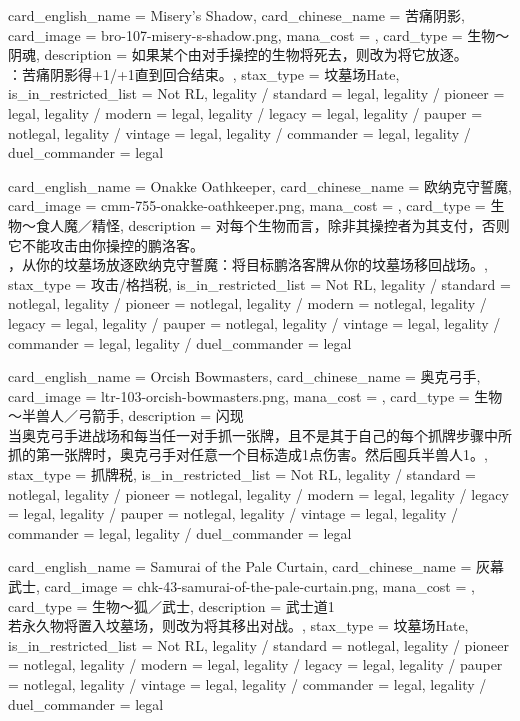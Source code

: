 \documentclass[lang = cn, color = black, 10pt]{AllThatStax}
\begin{document}
\card
{
	card_english_name = {Misery's Shadow},
	card_chinese_name = {苦痛阴影},
	card_image = bro-107-misery-s-shadow.png,
	mana_cost = ,
	card_type = 生物～阴魂,
	description = {如果某个由对手操控的生物将死去，则改为将它放逐。\\
：苦痛阴影得+1/+1直到回合结束。},
	stax_type = 坟墓场Hate,
	is_in_restricted_list = Not RL,
	legality / standard = legal,
	legality / pioneer = legal,
	legality / modern = legal,
	legality / legacy = legal,
	legality / pauper = notlegal,
	legality / vintage = legal,
	legality / commander = legal,
	legality / duel_commander = legal
}

\card
{
	card_english_name = {Onakke Oathkeeper},
	card_chinese_name = {欧纳克守誓魔},
	card_image = cmm-755-onakke-oathkeeper.png,
	mana_cost = ,
	card_type = 生物～食人魔／精怪,
	description = {对每个生物而言，除非其操控者为其支付，否则它不能攻击由你操控的鹏洛客。\\
，从你的坟墓场放逐欧纳克守誓魔：将目标鹏洛客牌从你的坟墓场移回战场。},
	stax_type = 攻击/格挡税,
	is_in_restricted_list = Not RL,
	legality / standard = notlegal,
	legality / pioneer = notlegal,
	legality / modern = notlegal,
	legality / legacy = legal,
	legality / pauper = notlegal,
	legality / vintage = legal,
	legality / commander = legal,
	legality / duel_commander = legal
}

\card
{
	card_english_name = {Orcish Bowmasters},
	card_chinese_name = {奥克弓手},
	card_image = ltr-103-orcish-bowmasters.png,
	mana_cost = ,
	card_type = 生物～半兽人／弓箭手,
	description = {闪现\\
当奥克弓手进战场和每当任一对手抓一张牌，且不是其于自己的每个抓牌步骤中所抓的第一张牌时，奥克弓手对任意一个目标造成1点伤害。然后囤兵半兽人1。},
	stax_type = 抓牌税,
	is_in_restricted_list = Not RL,
	legality / standard = notlegal,
	legality / pioneer = notlegal,
	legality / modern = legal,
	legality / legacy = legal,
	legality / pauper = notlegal,
	legality / vintage = legal,
	legality / commander = legal,
	legality / duel_commander = legal
}

\card
{
	card_english_name = {Samurai of the Pale Curtain},
	card_chinese_name = {灰幕武士},
	card_image = chk-43-samurai-of-the-pale-curtain.png,
	mana_cost = ,
	card_type = 生物～狐／武士,
	description = {武士道1\\
若永久物将置入坟墓场，则改为将其移出对战。},
	stax_type = 坟墓场Hate,
	is_in_restricted_list = Not RL,
	legality / standard = notlegal,
	legality / pioneer = notlegal,
	legality / modern = legal,
	legality / legacy = legal,
	legality / pauper = notlegal,
	legality / vintage = legal,
	legality / commander = legal,
	legality / duel_commander = legal
}
\end{document}
